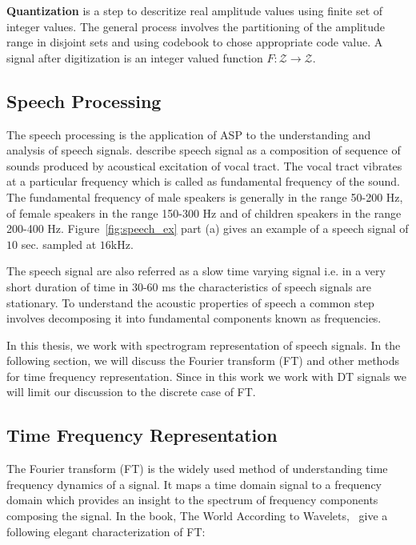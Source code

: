 \textbf{Quantization} is a step to descritize real amplitude values using finite set of integer values. The general process involves the partitioning of the amplitude range in disjoint sets and using codebook to chose appropriate code value. A signal after digitization is an integer valued function $F:\mathcal{Z}\rightarrow\mathcal{Z}$. 

\subsection{Speech Processing}
The speech processing is the application of ASP to the understanding and analysis of speech signals. 
\cite{meringer1999versprechen} describe speech signal as a composition of sequence of sounds produced by acoustical excitation of vocal tract. The vocal tract vibrates at a particular frequency which is called as fundamental frequency of the sound. The fundamental frequency of male speakers is generally in the range 50-200 Hz, of female speakers in the range 150-300 Hz and of children speakers in the range 200-400 Hz.  Figure~\ref{fig:speech_ex} part (a) gives an example of a speech signal of $10$ sec. sampled at $16$kHz. 

The speech signal are also referred as a slow time varying signal i.e. in a very short duration of time in 30-60 ms the characteristics of speech signals are stationary. To understand the acoustic properties of speech a common step involves decomposing it into fundamental components known as frequencies. 

In this thesis, we work with spectrogram representation of speech signals. In the following section, we will discuss the Fourier transform (FT) and other methods for time frequency representation. Since in this work we work with DT signals we will limit our discussion to the discrete case of FT.

\subsection{Time Frequency Representation}
\label{subsec:timefreq_rep}
The Fourier transform (FT) is the widely used method of understanding time frequency dynamics of a signal. It maps a time domain signal to a frequency domain which provides an insight to the spectrum of frequency components composing the signal. In the book, The World According to Wavelets,~\cite{hubbard1998world} give a following elegant characterization of FT:

